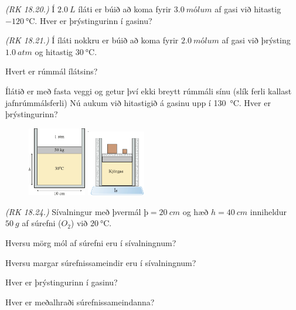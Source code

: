 \ifdefined \wholebook \else\documentclass[oneside]{book}\usepackage{EdlBook}\graphicspath{{figures/}}
\begin{document}
\begin{enumerate}[label = \textbf{Dæmi \thechapter.\arabic*.}]

\setcounter{enumi}{7}

\item \textit{(RK 18.20.)} Í $\SI{2.0}{L}$ íláti er búið að koma fyrir $\SI{3.0}{mólum}$ af gasi við hitastig $\SI{-120}{\celsius}$. Hver er þrýstingurinn í gasinu?

\item \textit{(RK 18.21.)} Í íláti nokkru er búið að koma fyrir $\SI{2.0}{mólum}$ af gasi við þrýsting $\SI{1.0}{atm}$ og hitastig $\SI{30}{\celsius}$. \begin{enumerate*}[label = \textbf{(\alph*)}]
    \item Hvert er rúmmál ílátsins?
    \item Ílátið er með fasta veggi og getur því ekki breytt rúmmáli sínu (slík ferli kallast jafnrúmmálsferli) Nú aukum við hitastigið á gasinu upp í \SI{130}{\celsius}. Hver er þrýstingurinn?
\end{enumerate*}


\begin{minipage}{\linewidth}

\begin{figure}
\includegraphics[width = 1in]{figures/dia-bulla.pdf}
\includegraphics[width = 1in]{figures/kjorgas-bulla.pdf}
\end{figure}

\item \textit{(RK 18.24.)} Sívalningur með þvermál $þ = \SI{20}{cm}$ og hæð $h = \SI{40}{cm}$ inniheldur $\SI{50}{g}$ af súrefni ($O_2$) við $\SI{20}{\celsius}$. \begin{enumerate*}[label = \textbf{(\alph*)}]
    \item Hversu mörg mól af súrefni eru í sívalningnum?
    \item Hversu margar súrefnissameindir eru í sívalningnum?
    \item Hver er þrýstingurinn í gasinu?
    \item Hver er meðalhraði súrefnissameindanna?
\end{enumerate*}


\end{minipage}
\end{enumerate}
\end{document}
